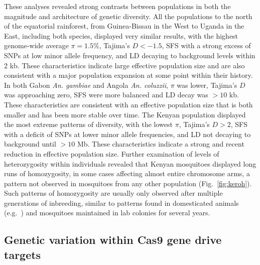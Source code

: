 \documentclass[a4paper,11pt,abstracton,hidelinks]{scrartcl}
\begin{document}
These analyses revealed strong contrasts between populations in both the magnitude and architecture of genetic diversity.
%
All the populations to the north of the equatorial rainforest, from Guinea-Bissau in the West to Uganda in the East, including both species, displayed very similar results, with the highest genome-wide average $\pi = 1.5\%$, Tajima's $D < -1.5$, SFS with a strong excess of SNPs at low minor allele frequency, and LD decaying to background levels within 2 kb.
%
These characteristics indicate large effective population size and are also consistent with a major population expansion at some point within their history.
%
In both Gabon \textit{An. gambiae} and Angola \textit{An. coluzzii}, $\pi$ was lower, Tajima's $D$ was approaching zero, SFS were more balanced and LD decay was $> 10$ kb.
%
These characteristics are consistent with an effective population size that is both smaller and has been more stable over time.
%
The Kenyan population displayed the most extreme patterns of diversity, with the lowest $\pi$, Tajima's $D > 2$, SFS with a deficit of SNPs at lower minor allele frequencies, and LD not decaying to background until $> 10$ Mb.
%
These characteristics indicate a strong and recent reduction in effective population size.
%
Further examination of levels of heterozygosity within individuals revealed that Kenyan mosquitoes displayed long runs of homozygosity, in some cases affecting almost entire chromosome arms, a pattern not observed in mosquitoes from any other population (Fig.~\ref{fig:keroh}).
%
Such patterns of homozygosity are usually only observed after multiple generations of inbreeding, similar to patterns found in domesticated animals (e.g.~\cite{Purfield2012}) and mosquitoes maintained in lab colonies for several years.


\subsection{Genetic variation within Cas9 gene drive targets}\label{subsec:gene-drive}
\end{document}
